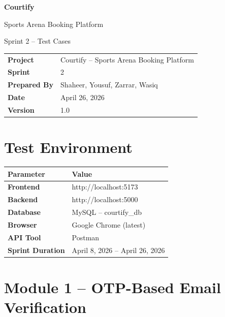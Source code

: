 \documentclass[12pt,a4paper]{article}
\begin{document}

\begin{titlepage}
\centering\vspace*{2cm}
{\Huge\bfseries\color{sectionblue} Courtify}\par\vspace{0.4cm}
{\Large Sports Arena Booking Platform}\par\vspace{1.5cm}
{\huge Sprint 2 -- Test Cases}\par\vspace{2cm}
\renewcommand{\arraystretch}{1.5}
\begin{tabular}{ll}
\textbf{Project}     & Courtify -- Sports Arena Booking Platform \\
\textbf{Sprint}      & 2 \\
\textbf{Prepared By} & Shaheer, Yousuf, Zarrar, Wasiq \\
\textbf{Date}        & April 26, 2026 \\
\textbf{Version}     & 1.0 \\
\end{tabular}
\end{titlepage}

\section{Test Environment}
\renewcommand{\arraystretch}{1.4}
\begin{tabularx}{\textwidth}{|>{\bfseries}p{3.5cm}|X|}
\hline
\rowcolor{headerbg}\color{white}Parameter & \color{white}Value \\ \hline
Frontend        & http://localhost:5173 \\ \hline
\rowcolor{rowgray}
Backend         & http://localhost:5000 \\ \hline
Database        & MySQL -- courtify\_db \\ \hline
\rowcolor{rowgray}
Browser         & Google Chrome (latest) \\ \hline
API Tool        & Postman \\ \hline
\rowcolor{rowgray}
Sprint Duration & April 8, 2026 -- April 26, 2026 \\ \hline
\end{tabularx}

\newpage

\section{Module 1 -- OTP-Based Email Verification}
\end{document}
